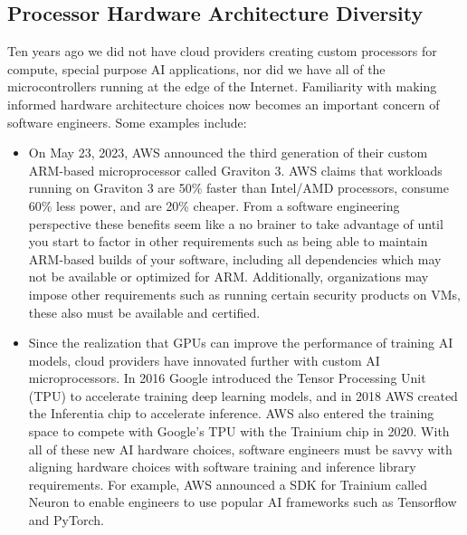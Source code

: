 \documentclass[conference]{IEEEtran}
\begin{document}
\subsection{Processor Hardware Architecture Diversity}
Ten years ago we did not have cloud providers creating custom processors for compute, special purpose AI applications, nor did we have all of the microcontrollers running at the edge of the Internet. Familiarity with making informed hardware architecture choices now becomes an important concern of software engineers. Some examples include:

\begin{itemize}
	\item On May 23, 2023, AWS announced the third generation of their custom ARM-based microprocessor called Graviton 3.  AWS claims that workloads running on Graviton 3 are 50\% faster than Intel/AMD processors, consume 60\% less power, and are 20\% cheaper. From a software engineering perspective these benefits seem like a no brainer to take advantage of until you start to factor in other requirements such as being able to maintain ARM-based builds of your software, including all dependencies which may not be available or optimized for ARM. Additionally, organizations may impose other requirements such as running certain security products on VMs, these also must be available and certified. 
		
	\item Since the realization that GPUs can improve the performance of training AI models, cloud providers have innovated further with custom AI microprocessors.  In 2016 Google introduced the Tensor Processing Unit (TPU) to accelerate training deep learning models, and in 2018 AWS created the Inferentia chip to accelerate inference. AWS also entered the training space to compete with Google's TPU with the Trainium chip in 2020.  With all of these new AI hardware choices, software engineers must be savvy with aligning hardware choices with software training and inference library requirements. For example, AWS announced a SDK for Trainium called Neuron to enable engineers to use popular AI frameworks such as Tensorflow and PyTorch.  
	

\end{itemize}
\end{document}
